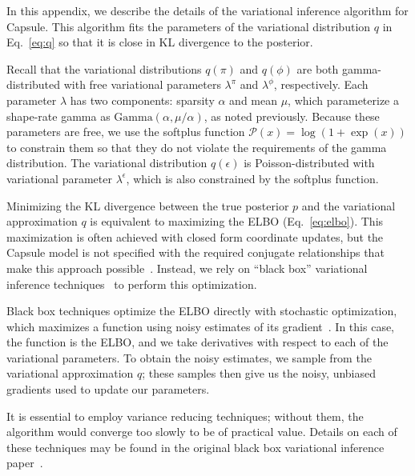 
In this appendix, we describe the details of the variational inference algorithm for Capsule. This algorithm fits the parameters of the variational distribution $q$ in Eq.~\ref{eq:q} so that it is close in KL divergence to the posterior.

Recall that the variational distributions $q(\pi)$ and $q(\phi)$ are both gamma-distributed with free variational parameters $\lambda^\pi$ and $\lambda^\phi$, respectively.  Each parameter $\lambda$ has two components: sparsity $\alpha$ and mean $\mu$, which parameterize a shape-rate gamma as $\mbox{Gamma}(\alpha,\mu/\alpha)$, as noted previously. Because these parameters are free, we use the softplus function $\mathcal{P}(x) = \log(1+\exp(x))$ to constrain them so that they do not violate the requirements of the gamma distribution.
The variational distribution $q(\epsilon)$ is Poisson-distributed with variational parameter $\lambda^\epsilon$, which is also constrained by the softplus function.

Minimizing the KL divergence between the true posterior $p$ and the variational approximation $q$ is equivalent to maximizing the ELBO (Eq.~\ref{eq:elbo}).  This maximization is often achieved with closed form coordinate updates, but the Capsule model is not specified with the required conjugate relationships that make this approach possible~\cite{Ghahramani:2001}.  Instead, we rely on ``black box'' variational inference techniques~\cite{Ranganath:2014} to perform this optimization.

Black box techniques optimize the ELBO directly with stochastic optimization, which maximizes a function using noisy estimates of its gradient~\cite{Robbins:1951}.  In this case, the function is the ELBO, and we take derivatives with respect to each of the variational parameters.  To obtain the noisy estimates, we sample from the variational approximation $q$; these samples then give us the noisy, unbiased gradients used to update our parameters.

It is essential to employ variance reducing techniques; without them, the algorithm would converge too slowly to be of practical value.  Details on each of these techniques may be found in the original black box variational inference paper~\cite{Ranganath:2014}.

